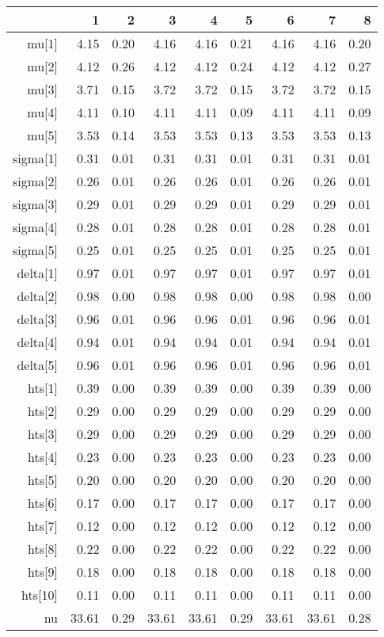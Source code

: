 \begin{table}[ht]
\centering
\begin{tabular}{rrrrrrrrr}
  \hline
 & 1 & 2 & 3 & 4 & 5 & 6 & 7 & 8 \\ 
  \hline
mu[1] & 4.15 & 0.20 & 4.16 & 4.16 & 0.21 & 4.16 & 4.16 & 0.20 \\ 
  mu[2] & 4.12 & 0.26 & 4.12 & 4.12 & 0.24 & 4.12 & 4.12 & 0.27 \\ 
  mu[3] & 3.71 & 0.15 & 3.72 & 3.72 & 0.15 & 3.72 & 3.72 & 0.15 \\ 
  mu[4] & 4.11 & 0.10 & 4.11 & 4.11 & 0.09 & 4.11 & 4.11 & 0.09 \\ 
  mu[5] & 3.53 & 0.14 & 3.53 & 3.53 & 0.13 & 3.53 & 3.53 & 0.13 \\ 
  sigma[1] & 0.31 & 0.01 & 0.31 & 0.31 & 0.01 & 0.31 & 0.31 & 0.01 \\ 
  sigma[2] & 0.26 & 0.01 & 0.26 & 0.26 & 0.01 & 0.26 & 0.26 & 0.01 \\ 
  sigma[3] & 0.29 & 0.01 & 0.29 & 0.29 & 0.01 & 0.29 & 0.29 & 0.01 \\ 
  sigma[4] & 0.28 & 0.01 & 0.28 & 0.28 & 0.01 & 0.28 & 0.28 & 0.01 \\ 
  sigma[5] & 0.25 & 0.01 & 0.25 & 0.25 & 0.01 & 0.25 & 0.25 & 0.01 \\ 
  delta[1] & 0.97 & 0.01 & 0.97 & 0.97 & 0.01 & 0.97 & 0.97 & 0.01 \\ 
  delta[2] & 0.98 & 0.00 & 0.98 & 0.98 & 0.00 & 0.98 & 0.98 & 0.00 \\ 
  delta[3] & 0.96 & 0.01 & 0.96 & 0.96 & 0.01 & 0.96 & 0.96 & 0.01 \\ 
  delta[4] & 0.94 & 0.01 & 0.94 & 0.94 & 0.01 & 0.94 & 0.94 & 0.01 \\ 
  delta[5] & 0.96 & 0.01 & 0.96 & 0.96 & 0.01 & 0.96 & 0.96 & 0.01 \\ 
  hts[1] & 0.39 & 0.00 & 0.39 & 0.39 & 0.00 & 0.39 & 0.39 & 0.00 \\ 
  hts[2] & 0.29 & 0.00 & 0.29 & 0.29 & 0.00 & 0.29 & 0.29 & 0.00 \\ 
  hts[3] & 0.29 & 0.00 & 0.29 & 0.29 & 0.00 & 0.29 & 0.29 & 0.00 \\ 
  hts[4] & 0.23 & 0.00 & 0.23 & 0.23 & 0.00 & 0.23 & 0.23 & 0.00 \\ 
  hts[5] & 0.20 & 0.00 & 0.20 & 0.20 & 0.00 & 0.20 & 0.20 & 0.00 \\ 
  hts[6] & 0.17 & 0.00 & 0.17 & 0.17 & 0.00 & 0.17 & 0.17 & 0.00 \\ 
  hts[7] & 0.12 & 0.00 & 0.12 & 0.12 & 0.00 & 0.12 & 0.12 & 0.00 \\ 
  hts[8] & 0.22 & 0.00 & 0.22 & 0.22 & 0.00 & 0.22 & 0.22 & 0.00 \\ 
  hts[9] & 0.18 & 0.00 & 0.18 & 0.18 & 0.00 & 0.18 & 0.18 & 0.00 \\ 
  hts[10] & 0.11 & 0.00 & 0.11 & 0.11 & 0.00 & 0.11 & 0.11 & 0.00 \\ 
  nu & 33.61 & 0.29 & 33.61 & 33.61 & 0.29 & 33.61 & 33.61 & 0.28 \\ 
   \hline
\end{tabular}
\end{table}
